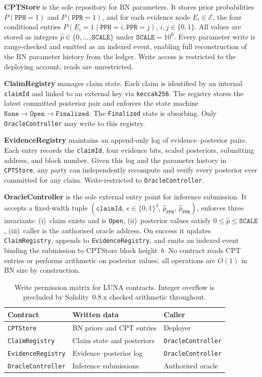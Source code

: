 \documentclass[journal]{IEEEtran}
\begin{document}
\textbf{CPTStore} is the sole repository for BN
parameters. It stores prior probabilities
$P(\texttt{PPH}=1)$ and $P(\texttt{PPR}=1)$, and for
each evidence node $E_i\in\mathcal{E}$, the four
conditional entries
$P(E_i=1\mid\texttt{PPH}=i,\texttt{PPR}=j)$,
$i,j\in\{0,1\}$. All values are stored as integers
$\widehat{p}\in\{0,\dots,\texttt{SCALE}\}$ under
$\texttt{SCALE}=10^6$. Every parameter write is
range-checked and emitted as an indexed event,
enabling full reconstruction of the BN parameter
history from the ledger. Write access is restricted
to the deploying account; reads are unrestricted.

\textbf{ClaimRegistry} manages claim state. Each
claim is identified by an internal \texttt{claimId}
and linked to an external key via \texttt{keccak256}.
The registry stores the latest committed posterior
pair and enforces the state machine
$\texttt{None}\to\texttt{Open}\to\texttt{Finalized}$.
The \texttt{Finalized} state is absorbing. Only
\texttt{OracleController} may write to this registry.

\textbf{EvidenceRegistry} maintains an append-only
log of evidence--posterior pairs. Each entry records
the \texttt{claimId}, four evidence bits, scaled
posteriors, submitting address, and block number.
Given this log and the parameter history in
\texttt{CPTStore}, any party can independently
recompute and verify every posterior ever committed
for any claim. Write-restricted to
\texttt{OracleController}.

\textbf{OracleController} is the sole external entry
point for inference submission. It accepts a
fixed-width tuple
$(\texttt{claimId},\,e\in\{0,1\}^4,\,
\widehat{p}_{\texttt{PPH}},\,
\widehat{p}_{\texttt{PPR}})$, enforces three
invariants: (i)~claim exists and is \texttt{Open},
(ii)~posterior values satisfy
$0\leq\widehat{p}\leq\texttt{SCALE}$,
(iii)~caller is the authorised oracle address.
On success it updates \texttt{ClaimRegistry}, appends
to \texttt{EvidenceRegistry}, and emits an indexed
event binding the submission to CPTStore block
height~$b$. No contract reads CPT entries or performs
arithmetic on posterior values; all operations are
$O(1)$ in BN size by construction.

\begin{table}[t]
\centering
\caption{Write permission matrix for LUNA contracts.
Integer overflow is precluded by Solidity~0.8.x
checked arithmetic throughout.}
\label{tab:access-control}
\begin{tabularx}{\columnwidth}{lXl}
\toprule
\textbf{Contract} &
\textbf{Written data} &
\textbf{Caller} \\
\midrule
\texttt{CPTStore}
  & BN priors and CPT entries
  & Deployer \\
\texttt{ClaimRegistry}
  & Claim state and posteriors
  & \texttt{OracleController} \\
\texttt{EvidenceRegistry}
  & Evidence--posterior log
  & \texttt{OracleController} \\
\texttt{OracleController}
  & Inference submissions
  & Authorised oracle \\
\bottomrule
\end{tabularx}
\end{table}
\end{document}
